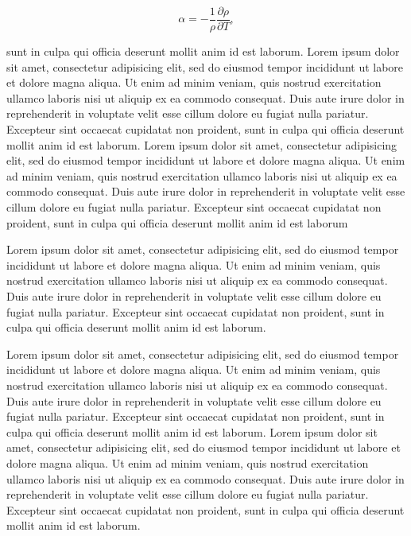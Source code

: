 \documentclass[logo=logo-eagle]{thesis_proposal}
\begin{document}
\begin{equation}
  \label{e:expansion}
  \alpha = -\frac{1}{\rho}\frac{\partial \rho}{\partial T},
\end{equation}

sunt in culpa qui officia deserunt mollit anim id est laborum. Lorem
ipsum dolor sit amet, consectetur adipisicing elit, sed do eiusmod
tempor incididunt ut labore et dolore magna aliqua. Ut enim ad minim
veniam, quis nostrud exercitation ullamco laboris nisi ut aliquip ex
ea commodo consequat. Duis aute irure dolor in reprehenderit in
voluptate velit esse cillum dolore eu fugiat nulla pariatur. Excepteur
sint occaecat cupidatat non proident, sunt in culpa qui officia
deserunt mollit anim id est laborum.  Lorem ipsum dolor sit amet,
consectetur adipisicing elit, sed do eiusmod tempor incididunt ut
labore et dolore magna aliqua. Ut enim ad minim veniam, quis nostrud
exercitation ullamco laboris nisi ut aliquip ex ea commodo
consequat. Duis aute irure dolor in reprehenderit in voluptate velit
esse cillum dolore eu fugiat nulla pariatur. Excepteur sint occaecat
cupidatat non proident, sunt in culpa qui officia deserunt mollit anim
id est laborum


Lorem ipsum dolor sit amet, consectetur adipisicing elit, sed do
eiusmod tempor incididunt ut labore et dolore magna aliqua. Ut enim ad
minim veniam, quis nostrud exercitation ullamco laboris nisi ut
aliquip ex ea commodo consequat. Duis aute irure dolor in
reprehenderit in voluptate velit esse cillum dolore eu fugiat nulla
pariatur. Excepteur sint occaecat cupidatat non proident, sunt in
culpa qui officia deserunt mollit anim id est laborum.

Lorem ipsum dolor sit amet, consectetur adipisicing elit, sed do
eiusmod tempor incididunt ut labore et dolore magna aliqua. Ut enim ad
minim veniam, quis nostrud exercitation ullamco laboris nisi ut
aliquip ex ea commodo consequat. Duis aute irure dolor in
reprehenderit in voluptate velit esse cillum dolore eu fugiat nulla
pariatur. Excepteur sint occaecat cupidatat non proident, sunt in
culpa qui officia deserunt mollit anim id est laborum. Lorem ipsum
dolor sit amet, consectetur adipisicing elit, sed do eiusmod tempor
incididunt ut labore et dolore magna aliqua. Ut enim ad minim veniam,
quis nostrud exercitation ullamco laboris nisi ut aliquip ex ea
commodo consequat.  Duis aute irure dolor in reprehenderit in
voluptate velit esse cillum dolore eu fugiat nulla pariatur. Excepteur
sint occaecat cupidatat non proident, sunt in culpa qui officia
deserunt mollit anim id est laborum.
\end{document}
